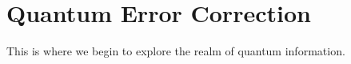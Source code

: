 \chapter{Quantum Error Correction}
\label{chapt9}

This is where we begin to explore the realm of quantum information.